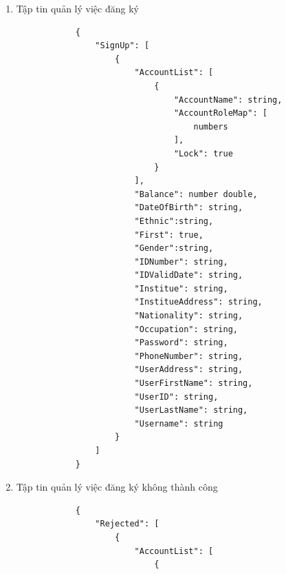 \documentclass[12pt,a4paper]{report}
\begin{document}
\begin{enumerate}
\begin{verbatim}
            }
            \end{verbatim}
            \newpage
            \item Tập tin quản lý việc đăng ký
%
            \begin{verbatim}
            {
                "SignUp": [
                    {
                        "AccountList": [
                            {
                                "AccountName": string,
                                "AccountRoleMap": [
                                    numbers
                                ],
                                "Lock": true
                            }
                        ],
                        "Balance": number double,
                        "DateOfBirth": string,
                        "Ethnic":string,
                        "First": true,
                        "Gender":string,
                        "IDNumber": string,
                        "IDValidDate": string,
                        "Institue": string,
                        "InstitueAddress": string,
                        "Nationality": string,
                        "Occupation": string,
                        "Password": string,
                        "PhoneNumber": string,
                        "UserAddress": string,
                        "UserFirstName": string,
                        "UserID": string,
                        "UserLastName": string,
                        "Username": string
                    }
                ]
            }
            \end{verbatim}
            \newpage
            \item Tập tin quản lý việc đăng ký không thành công
%
            \begin{verbatim}
            {
                "Rejected": [
                    {
                        "AccountList": [
                            {

\end{verbatim}
\end{enumerate}
\end{document}
